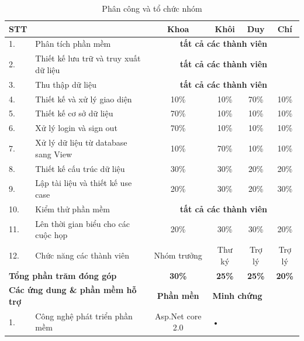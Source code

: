 \documentclass[a4paper]{article}
\begin{document}
	\begin{table}[h!]
	\centering
	\caption{Phân công và tổ chức nhóm}
	\label{tb:rubrics}
	\begin{tabularx}{475pt}{|l|X|c|c|c|c|}
		\hline\hline
		\textbf{STT} & \backslashbox{\textbf{Công việc}}{\textbf{Thành viên}} & \textbf{ Khoa} & \textbf{ Khôi} & \textbf{ Duy} & \textbf{ Chí}\\
		\hline
		1. & Phân tích phần mềm & \multicolumn{4}{|c|}{\textbf{tất cả các thành viên}}  \\ \hline
		2. & Thiết kế  lưu trữ và truy xuất dữ liệu   & \multicolumn{4}{|c|}{\textbf{tất cả các thành viên}} \\ \hline

		3. & Thu thập dữ liệu  & \multicolumn{4}{|c|}{\textbf{tất cả các thành viên}}  \\ \hline

		4. & Thiết kế và xử lý giao diện  & 10\% & 10\% & 70\% & 10\% \\ \hline

		5. & Thiết kế cơ sở dữ liệu & 70\% & 10\% & 10\% & 10\% \\ \hline
		6. & Xử lý login và sign out & 70\% & 10\% & 10\% & 10\% \\ \hline

		7. & Xử lý dữ liệu từ database sang View & 10\% & 70\% & 10\% & 10\% \\ \hline

		8. & Thiết kế cấu trúc dữ liệu & 30\% & 30\% & 20\% & 20\% \\ \hline

		9. & Lập tài liệu và thiết kế use case & 20\% & 30\% & 20\% & 30\% \\ \hline

		10. & Kiểm thử phần mềm & \multicolumn{4}{|c|}{\textbf{tất cả các thành viên}}  \\ \hline

		11. & Lên thời gian biểu cho các cuộc họp & 20\% & 30\% & 30\% & 20\% \\ \hline

		12. & Chức năng các thành viên & Nhóm trưởng & Thư ký & Trợ lý & Trợ lý \\ \hline


		\multicolumn{2}{|l|}{\textbf{Tổng phần trăm đóng góp}} &\textbf{30\%}& \textbf{25\%}& \textbf{25\%} & \textbf{20\%} \\ \hline

		\multicolumn{2}{|l|}{\textbf{Các ứng dung \& phần mềm hỗ trợ}} & \textbf{Phần mền} & \multicolumn{3}{l|}{\textbf{Minh chứng}} \\ \hline
		1. & Công nghệ phát triển phần mềm & Asp.Net core 2.0 	& \multicolumn{3}{l|}{•} \\ \hline


\end{tabularx}
\end{table}
\end{document}
